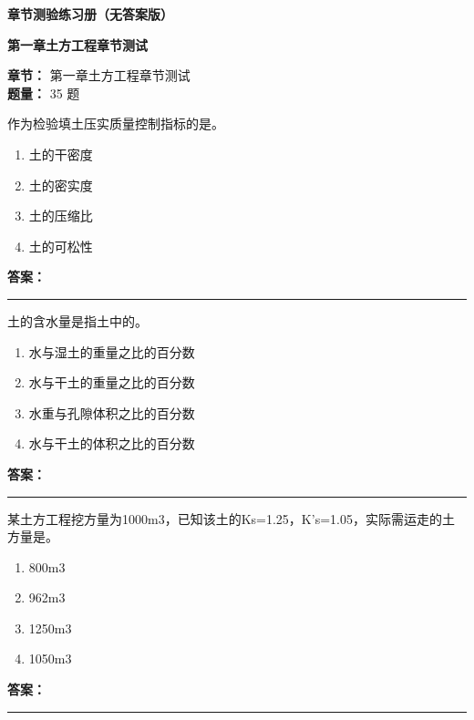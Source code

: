 \documentclass[UTF8,fontset=fandol,11pt]{ctexart}
\newcommand{\chaptertitle}[1]{\vspace{0.5em}\begin{tcolorbox}[enhanced,colback=deepblue,colframe=deepblue,arc=2mm,boxrule=0pt]\begin{center}\Large\bfseries\color{white}#1\end{center}\end{tcolorbox}\vspace{0.5em}}
\newcommand{\answerline}{\textcolor{answerred}{\rule{2.4cm}{0.7pt}}}
\begin{document}
\tableofcontents

\newpage

\chaptertitle{章节测验练习册（无答案版）}

\chaptertitle{第一章土方工程章节测试}
\begin{mainbox}
\textbf{\textcolor{mainblue}{章节：}} 第一章土方工程章节测试\\
\textbf{\textcolor{answerred}{题量：}} 35 题
\end{mainbox}

\begin{quizbox}[title={第 1 题}]
作为检验填土压实质量控制指标的是。\\
\begin{enumerate}[label=\Alph*.]
\item 土的干密度
\item 土的密实度
\item 土的压缩比
\item 土的可松性
\end{enumerate}
\textbf{\textcolor{answerred}{答案：}} \answerline
\end{quizbox}

\vspace{0.2em}

\begin{quizbox}[title={第 2 题}]
土的含水量是指土中的。\\
\begin{enumerate}[label=\Alph*.]
\item 水与湿土的重量之比的百分数
\item 水与干土的重量之比的百分数
\item 水重与孔隙体积之比的百分数
\item 水与干土的体积之比的百分数
\end{enumerate}
\textbf{\textcolor{answerred}{答案：}} \answerline
\end{quizbox}

\vspace{0.2em}

\begin{quizbox}[title={第 3 题}]
某土方工程挖方量为1000m3，已知该土的Ks=1.25，K’s=1.05，实际需运走的土方量是。\\
\begin{enumerate}[label=\Alph*.]
\item 800m3
\item 962m3
\item 1250m3
\item 1050m3
\end{enumerate}
\textbf{\textcolor{answerred}{答案：}} \answerline
\end{quizbox}
\end{document}
